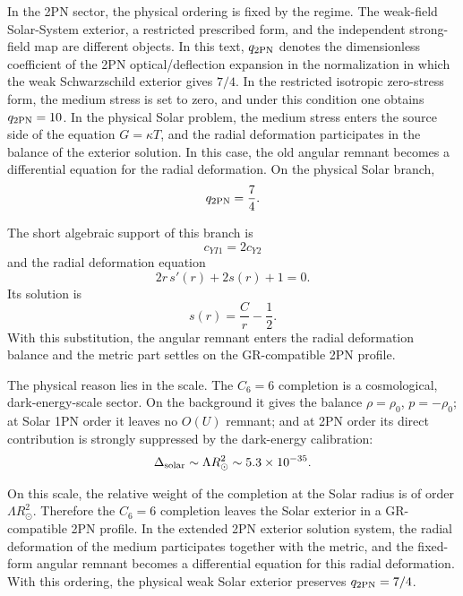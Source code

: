 \documentclass[12pt]{article}
\begin{document}
In the 2PN sector, the physical ordering is fixed by the regime. The weak-field Solar-System exterior, a restricted prescribed form, and the independent strong-field map are different objects. In this text, $q_{\rm 2PN}$ denotes the dimensionless coefficient of the 2PN optical/deflection expansion in the normalization in which the weak Schwarzschild exterior gives $7/4$. In the restricted isotropic zero-stress form, the medium stress is set to zero, and under this condition one obtains $q_{\rm 2PN}=10$. In the physical Solar problem, the medium stress enters the source side of the equation $G=\kappa T$, and the radial deformation participates in the balance of the exterior solution. In this case, the old angular remnant becomes a differential equation for the radial deformation. On the physical Solar branch,
\begin{equation}
q_{\rm 2PN}=\frac74 .
\end{equation}

The short algebraic support of this branch is
\begin{equation}
c_{YI1}=2c_{Y2}
\end{equation}
and the radial deformation equation
\begin{equation}
2r\,s'(r)+2s(r)+1=0 .
\end{equation}
Its solution is
\begin{equation}
s(r)=\frac{C}{r}-\frac12 .
\end{equation}
With this substitution, the angular remnant enters the radial deformation balance and the metric part settles on the GR-compatible 2PN profile.

The physical reason lies in the scale. The $C_6=6$ completion is a cosmological, dark-energy-scale sector. On the background it gives the balance $\rho=\rho_0$, $p=-\rho_0$; at Solar 1PN order it leaves no $O(U)$ remnant; and at 2PN order its direct contribution is strongly suppressed by the dark-energy calibration:
\begin{equation}
\Delta_{\rm solar}\sim \Lambda R_\odot^2\sim5.3\times10^{-35}.
\end{equation}

On this scale, the relative weight of the completion at the Solar radius is of order $\Lambda R_\odot^2$. Therefore the $C_6=6$ completion leaves the Solar exterior in a GR-compatible 2PN profile. In the extended 2PN exterior solution system, the radial deformation of the medium participates together with the metric, and the fixed-form angular remnant becomes a differential equation for this radial deformation. With this ordering, the physical weak Solar exterior preserves $q_{\rm 2PN}=7/4$.
\end{document}
